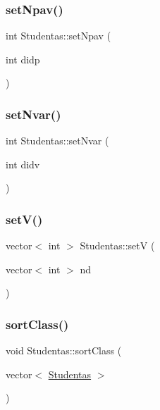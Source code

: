 \mbox{\label{class_studentas_abe6369aa11c793bc46b1b2ef0067c942}} 
\subsubsection{\texorpdfstring{setNpav()}{setNpav()}}
{\footnotesize\ttfamily int Studentas\+::set\+Npav (\begin{DoxyParamCaption}\item[{int}]{didp }\end{DoxyParamCaption})}

\mbox{\label{class_studentas_ac7d635d4eaf600c486b9511249106b27}} 
\subsubsection{\texorpdfstring{setNvar()}{setNvar()}}
{\footnotesize\ttfamily int Studentas\+::set\+Nvar (\begin{DoxyParamCaption}\item[{int}]{didv }\end{DoxyParamCaption})}

\mbox{\label{class_studentas_a48db4c8859efce4505444f85c9c9b4ea}} 
\subsubsection{\texorpdfstring{setV()}{setV()}}
{\footnotesize\ttfamily vector$<$ int $>$ Studentas\+::setV (\begin{DoxyParamCaption}\item[{vector$<$ int $>$}]{nd }\end{DoxyParamCaption})}

\mbox{\label{class_studentas_a4ec32f3cae767ae8f71bdf5928045e94}} 
\subsubsection{\texorpdfstring{sortClass()}{sortClass()}}
{\footnotesize\ttfamily void Studentas\+::sort\+Class (\begin{DoxyParamCaption}\item[{vector$<$ \mbox{\hyperlink{class_studentas}{Studentas}} $>$}]{ }\end{DoxyParamCaption})}



